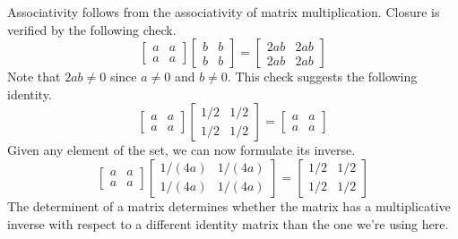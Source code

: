 \documentclass{article}
\begin{document}
Associativity follows from the associativity of matrix multiplication.
Closure is verified by the following check.
\begin{equation*}
\left[\begin{array}{cc}a&a\\a&a\end{array}\right]
\left[\begin{array}{cc}b&b\\b&b\end{array}\right]
=
\left[\begin{array}{cc}2ab&2ab\\2ab&2ab\end{array}\right]
\end{equation*}
Note that $2ab\neq 0$ since $a\neq 0$ and $b\neq 0$.
This check suggests the following identity.
\begin{equation*}
\left[\begin{array}{cc}a&a\\a&a\end{array}\right]
\left[\begin{array}{cc}1/2&1/2\\1/2&1/2\end{array}\right]
=
\left[\begin{array}{cc}a&a\\a&a\end{array}\right]
\end{equation*}
Given any element of the set, we can now formulate its inverse.
\begin{equation*}
\left[\begin{array}{cc}a&a\\a&a\end{array}\right]
\left[\begin{array}{cc}1/(4a)&1/(4a)\\1/(4a)&1/(4a)\end{array}\right]
=
\left[\begin{array}{cc}1/2&1/2\\1/2&1/2\end{array}\right]
\end{equation*}
The determinent of a matrix determines whether the matrix has a multiplicative
inverse with respect to a different identity matrix than the one we're using here.
\end{document}
